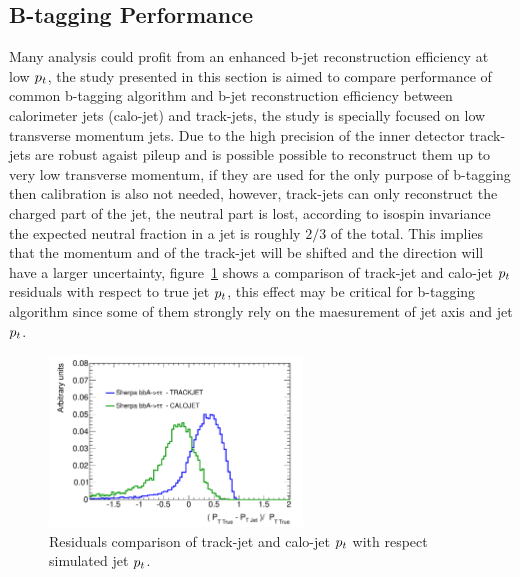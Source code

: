 \subsection{B-tagging Performance}
Many analysis could profit from an enhanced b-jet reconstruction efficiency at low $p_{t}$, 
the study presented in this section is aimed to compare performance of common 
b-tagging algorithm and b-jet reconstruction efficiency between calorimeter jets (calo-jet)
and track-jets, the study is specially focused on low transverse momentum jets.
Due to the high precision of the inner detector track-jets are robust agaist 
pileup and is possible possible to reconstruct them up to very low transverse momentum,
if they are used for the only purpose of b-tagging then calibration is also not needed,
however, track-jets can only reconstruct the charged part of the jet, the neutral part is lost,
according to isospin invariance the expected neutral fraction in a jet is roughly $2/3$ of the total.
This implies that the momentum and  of the track-jet will be shifted and the direction will 
have a larger uncertainty, figure~\ref{fig:residuals} shows a comparison of track-jet and calo-jet $p_{t}$ residuals 
with respect to true jet $p_{t}$, this effect may be critical for b-tagging algorithm since some of them
strongly rely on the maesurement of jet axis and jet $p_{t}$.

\begin{figure}[tp]
\centering
\includegraphics[width=0.6\textwidth]{figure/trackjet/residuals.pdf}
\caption{Residuals comparison of track-jet and calo-jet $p_{t}$ with respect simulated jet $p_{t}$.}
\label{fig:residuals}
\end{figure}    

